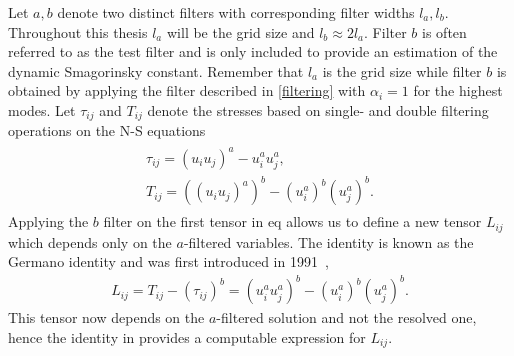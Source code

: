 Let $a,b$ denote two distinct filters with corresponding filter widths $l_a,l_b$. 
Throughout this thesis $l_a$ will be the grid size and $l_b\approx 2l_a$. Filter $b$ is
often referred to as the test filter and is only included to provide an estimation 
of the dynamic Smagorinsky constant. Remember that $l_a$ is the grid size while 
filter $b$ is obtained by applying the filter described in \cref{filtering} with $\alpha_i=1$ for the highest modes.
Let $\tau_{ij}$ and $T_{ij}$ denote the stresses based on single- and double filtering
operations on the N-S equations
\begin{align}
    \begin{split}
    \tau_{ij} = (u_iu_j)^a - u_i^au_j^a,\\
    T_{ij} = ((u_iu_j)^a)^b - (u_i^a)^b(u_j^a)^b.
    \end{split}
    \label{eq:stresstensors}
\end{align}
Applying the $b$ filter on the first tensor in eq  allows us to define 
a new tensor $L_{ij}$ which depends only on the $a$-filtered variables. The identity 
is known as the Germano identity and was first introduced in 1991~\cite{Germano91},
\begin{align}
    L_{ij} = T_{ij} - (\tau_{ij})^b
    = (u_i^au_j^a)^b - (u_i^a)^b(u_j^a)^b.
    \label{eq:germanoid}
\end{align}
This tensor now depends on the $a$-filtered solution and not the resolved 
one, hence the identity in  provides a computable expression for $L_{ij}$.

